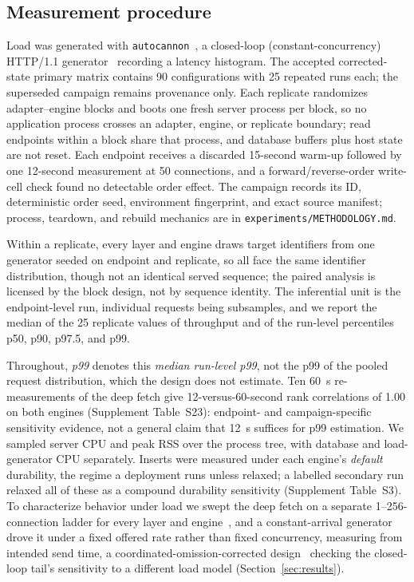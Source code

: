 \subsection{Measurement procedure}
Load was generated with \texttt{autocannon}~\cite{autocannon}, a closed-loop (constant-concurrency) HTTP/1.1 generator~\cite{schroeder2006open} recording a latency histogram.
The accepted corrected-state primary matrix contains 90 configurations with 25 repeated runs each; the superseded campaign remains provenance only.
Each replicate randomizes adapter--engine blocks and boots one fresh server process per block, so no application process crosses an adapter, engine, or replicate boundary; read endpoints within a block share that process, and database buffers plus host state are not reset.
Each endpoint receives a discarded 15-second warm-up followed by one 12-second measurement at 50 connections, and a forward/reverse-order write-cell check found no detectable order effect.
The campaign records its ID, deterministic order seed, environment fingerprint, and exact source manifest; process, teardown, and rebuild mechanics are in \texttt{experiments/METHODOLOGY.md}.

Within a replicate, every layer and engine draws target identifiers from one generator seeded on endpoint and replicate, so all face the same identifier distribution, though not an identical served sequence; the paired analysis is licensed by the block design, not by sequence identity.
The inferential unit is the endpoint-level run, individual requests being subsamples, and we report the median of the 25 replicate values of throughput and of the run-level percentiles p50, p90, p97.5, and p99.

Throughout, \emph{p99} denotes this \emph{median run-level p99}, not the p99 of the pooled request distribution, which the design does not estimate.
Ten 60~s re-measurements of the deep fetch give 12-versus-60-second rank correlations of 1.00 on both engines (Supplement Table~S23): endpoint- and campaign-specific sensitivity evidence, not a general claim that 12~s suffices for p99 estimation.
We sampled server CPU and peak RSS over the process tree, with database and load-generator CPU separately.
Inserts were measured under each engine's \emph{default} durability, the regime a deployment runs unless relaxed; a labelled secondary run relaxed all of these as a compound durability sensitivity (Supplement Table~S3).
To characterize behavior under load we swept the deep fetch on a separate 1--256-connection ladder for every layer and engine~\cite{yu2014concurrency}, and a constant-arrival generator drove it under a fixed offered rate rather than fixed concurrency, measuring from intended send time, a coordinated-omission-corrected design~\cite{tene2015latency,krishnamachari2026stats} checking the closed-loop tail's sensitivity to a different load model (Section~\ref{sec:results}).


